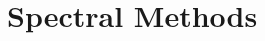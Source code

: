 \documentclass{article}
\begin{document}
\section{Spectral Methods}




\begin{appendix}
\begin{comment}
\section{Gradient Estimator Implementation}
In the log-semiring, addition is given by $\bigoplus = \LSE$ and multiplication
by $\bigotimes = +$.
Consider the linear chain CRF, $\bigotimes_t \psi(x_{t-1}, x_t)$,
with $\psi(x_{t-1}, t) = f(x_t) \oplus g(x_{t-1},x_t)$.
We would like to compute the gradient of the
log partition function, $A = \bigoplus_x \bigotimes_t \psi(x_{t-1}, x_t)$.
Recall the gradient identities 
\begin{equation}
\begin{aligned}
\nabla_a a \bigoplus b &= \frac{\exp(a)}{\exp(a \bigoplus b)}\\
\nabla_a a \bigotimes b &= 1.
\end{aligned}
\end{equation}

We then have 
\begin{equation}
\begin{aligned}
\nabla_{\psi(x_a,x_b)} &\bigoplus_t \psi(x_{t-1}, x_t)\\
&= \nabla_{\psi(x_a,x_b)} \bigoplus_t \psi(x_{t-1}, x_t)\\
\end{aligned}
\end{equation}
\end{comment}

\end{appendix}
\end{document}
